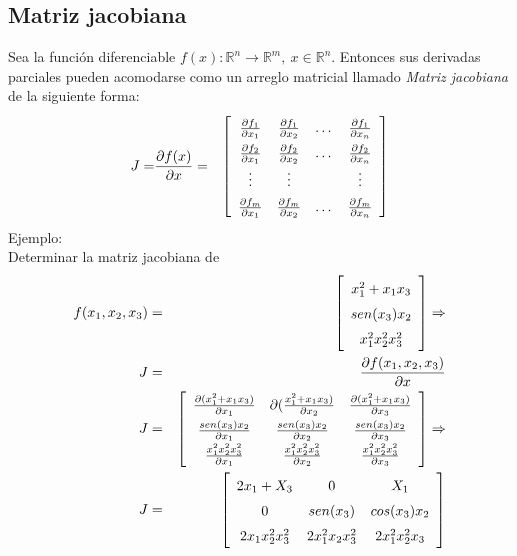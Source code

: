 \documentclass[12pt,spanish,lettersize]{report}
\begin{document}
\subsection{Matriz jacobiana}
Sea la funci\'on diferenciable $f(x):\mathbb{R}^n\rightarrow\mathbb{R}^m,\ x\in\mathbb{R}^n$. Entonces sus derivadas parciales pueden acomodarse como un arreglo matricial llamado \emph{Matriz jacobiana} de la siguiente forma:
\begin{eqnarray}
J=&\frac{\partial f(x)}{\partial x}=&
\left[
\renewcommand{\arraystretch}{1.5}
\begin{array}{cccc}
\frac{\partial f_1}{\partial x_1}&\frac{\partial f_1}{\partial x_2}&\dots&\frac{\partial f_1}{\partial x_n}\\
\frac{\partial f_2}{\partial x_1}&\frac{\partial f_2}{\partial x_2}&\dots&\frac{\partial f_2}{\partial x_n}\\
\vdots&\vdots&&\vdots\\
\frac{\partial f_m}{\partial x_1}&\frac{\partial f_m}{\partial x_2}&\dots&\frac{\partial f_m}{\partial x_n}
\end{array}\right]
\end{eqnarray}
Ejemplo:\\
Determinar la matriz jacobiana de
\begin{eqnarray}
\nonumber f(x_1,x_2,x_3)&=&\left[
\renewcommand{\arraystretch}{1.5}
\begin{array}{c}
x_1^2+x_1x_3\\
sen(x_3)x_2\\
x_1^2x_2^2x_3^2
\end{array}\right]\Rightarrow\\
\nonumber J&=&\frac{\partial f(x_1,x_2,x_3)}{\partial x}\\
\nonumber J&=&\left[
\renewcommand{\arraystretch}{1.5}
\begin{array}{ccc}
\frac{\partial(x_1^2+x_1x_3)}{\partial x_1}&\partial(\frac{x_1^2+x_1x_3)}{\partial x_2}&\frac{\partial(x_1^2+x_1x_3)}{\partial x_3}\\
\frac{sen(x_3)x_2}{\partial x_1}&\frac{sen(x_3)x_2}{\partial x_2}&\frac{sen(x_3)x_2}{\partial x_3}\\
\frac{x_1^2x_2^2x_3^2}{\partial x_1}&\frac{x_1^2x_2^2x_3^2}{\partial x_2}&\frac{x_1^2x_2^2x_3^2}{\partial x_3}\\
\end{array}\right]\Rightarrow\\
\nonumber J&=&\left[
\renewcommand{\arraystretch}{1.5}
\begin{array}{ccc}
2x_1+X_3&0&X_1\\
0&sen(x_3)&cos(x_3)x_2\\
2x_1x_2^2x_3^2&2x_1^2x_2x_3^2&2x_1^2x_2^2x_3\\
\end{array}\right]
\end{eqnarray}
\end{document}
